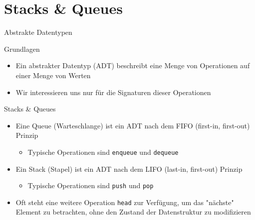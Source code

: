\section{Stacks \& Queues}

\begin{frame}{Abstrakte Datentypen}
\begin{block}{Grundlagen}
\begin{itemize}
    \item Ein \alert{abstrakter Datentyp (ADT)} beschreibt eine Menge von Operationen auf einer Menge von Werten
    \item Wir interessieren uns nur f\"ur die \alert{Signaturen} dieser Operationen
\end{itemize}
\end{block}

\begin{block}{Stacks \& Queues}
\begin{itemize}
    \item Eine \alert{Queue} (Warteschlange) ist ein ADT nach dem \alert{FIFO} (first-in, first-out) Prinzip
    \begin{itemize}
        \item Typische Operationen sind \texttt{enqueue} und \texttt{dequeue}
    \end{itemize}
    \item Ein \alert{Stack} (Stapel) ist ein ADT nach dem \alert{LIFO} (last-in, first-out) Prinzip
    \begin{itemize}
        \item Typische Operationen sind \texttt{push} und \texttt{pop}
    \end{itemize}
    \item Oft steht eine weitere Operation \texttt{head} zur Verf\"ugung, um das "n\"achste" Element zu betrachten, ohne den \alert{Zustand} der Datenstruktur zu modifizieren
\end{itemize}
\end{block}
\end{frame}

